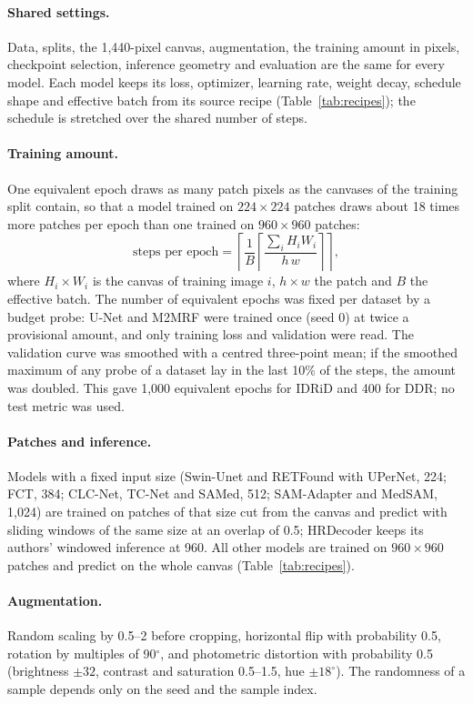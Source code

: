 \paragraph{Shared settings.} Data, splits, the 1,440-pixel canvas, augmentation, the training amount in pixels, checkpoint selection, inference geometry and evaluation are the same for every model. Each model keeps its loss, optimizer, learning rate, weight decay, schedule shape and effective batch from its source recipe (Table~\ref{tab:recipes}); the schedule is stretched over the shared number of steps.

\paragraph{Training amount.} One equivalent epoch draws as many patch pixels as the canvases of the training split contain, so that a model trained on $224\times224$ patches draws about 18 times more patches per epoch than one trained on $960\times960$ patches:
\begin{equation}
\text{steps per epoch}=\left\lceil \frac{1}{B}\left\lceil \frac{\sum_i H_i W_i}{h\,w} \right\rceil \right\rceil ,
\end{equation}
where $H_i\times W_i$ is the canvas of training image $i$, $h\times w$ the patch and $B$ the effective batch. The number of equivalent epochs was fixed per dataset by a budget probe: U-Net and M2MRF were trained once (seed 0) at twice a provisional amount, and only training loss and validation \mAUPR{} were read. The validation curve was smoothed with a centred three-point mean; if the smoothed maximum of any probe of a dataset lay in the last 10\% of the steps, the amount was doubled. This gave 1,000 equivalent epochs for IDRiD and 400 for DDR; no test metric was used.

\paragraph{Patches and inference.} Models with a fixed input size (Swin-Unet and RETFound with UPerNet, 224; FCT, 384; CLC-Net, TC-Net and SAMed, 512; SAM-Adapter and MedSAM, 1,024) are trained on patches of that size cut from the canvas and predict with sliding windows of the same size at an overlap of 0.5; HRDecoder keeps its authors' windowed inference at 960. All other models are trained on $960\times960$ patches and predict on the whole canvas (Table~\ref{tab:recipes}).

\paragraph{Augmentation.} Random scaling by 0.5--2 before cropping, horizontal flip with probability 0.5, rotation by multiples of 90$^\circ$, and photometric distortion with probability 0.5 (brightness $\pm32$, contrast and saturation 0.5--1.5, hue $\pm18^\circ$). The randomness of a sample depends only on the seed and the sample index.

